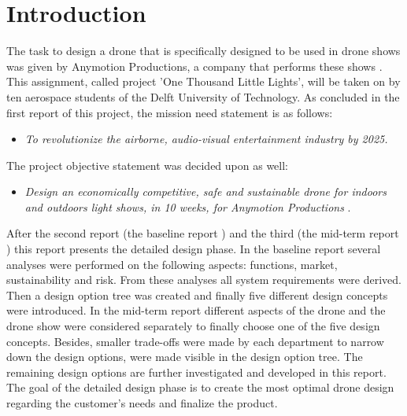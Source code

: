 \chapter{Introduction}
\label{ch:introduction}


The task to design a drone that is specifically designed to be used in drone shows was given by Anymotion Productions, a company that performs these shows \cite{projectguide}. This assignment, called project 'One Thousand Little Lights', will be taken on by ten aerospace students of the Delft University of Technology. As concluded in the first report of this project, the mission need statement is as follows:
\begin{itemize}[noitemsep,nolistsep]
    \item \textit{To revolutionize the airborne, audio-visual entertainment industry by 2025.\cite{projectplan}}
\end{itemize}

The project objective statement was decided upon as well:

\begin{itemize}[noitemsep,nolistsep]
    \item \textit{Design an economically competitive, safe and sustainable drone for indoors and outdoors light shows, in 10 weeks, for Anymotion Productions} \cite{projectplan}.
\end{itemize}

After the second report (the baseline report \cite{baseline-report}) and the third (the mid-term report \cite{midterm}) this report presents the detailed design phase. In the baseline report several analyses were performed on the following aspects: functions, market, sustainability and risk. From these analyses all system requirements were derived. Then a design option tree was created and finally five different design concepts were introduced. In the mid-term report different aspects of the drone and the drone show were considered separately to finally choose one of the five design concepts. Besides, smaller trade-offs were made by each department to narrow down the design options, were made visible in the design option tree. The remaining design options are further investigated and developed in this report. The goal of the detailed design phase is to create the most optimal drone design regarding the customer's needs and finalize the product.

